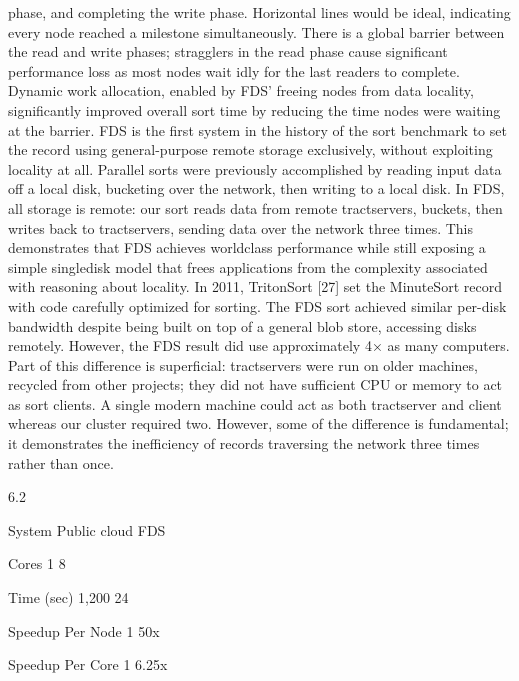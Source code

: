 phase, and completing the write phase. Horizontal lines
would be ideal, indicating every node reached a milestone simultaneously. There is a global barrier between
the read and write phases; stragglers in the read phase
cause significant performance loss as most nodes wait
idly for the last readers to complete. Dynamic work allocation, enabled by FDS’ freeing nodes from data locality,
significantly improved overall sort time by reducing the
time nodes were waiting at the barrier.
FDS is the first system in the history of the sort benchmark to set the record using general-purpose remote storage exclusively, without exploiting locality at all. Parallel sorts were previously accomplished by reading input
data off a local disk, bucketing over the network, then
writing to a local disk. In FDS, all storage is remote: our
sort reads data from remote tractservers, buckets, then
writes back to tractservers, sending data over the network
three times. This demonstrates that FDS achieves worldclass performance while still exposing a simple singledisk model that frees applications from the complexity
associated with reasoning about locality.
In 2011, TritonSort [27] set the MinuteSort record
with code carefully optimized for sorting. The FDS
sort achieved similar per-disk bandwidth despite being
built on top of a general blob store, accessing disks remotely. However, the FDS result did use approximately
4× as many computers. Part of this difference is superficial: tractservers were run on older machines, recycled
from other projects; they did not have sufficient CPU
or memory to act as sort clients. A single modern machine could act as both tractserver and client whereas our
cluster required two. However, some of the difference is
fundamental; it demonstrates the inefficiency of records
traversing the network three times rather than once.

6.2

System
Public cloud
FDS

Cores
1
8

Time
(sec)
1,200
24

Speedup
Per Node
1
50x

Speedup
Per Core
1
6.25x


